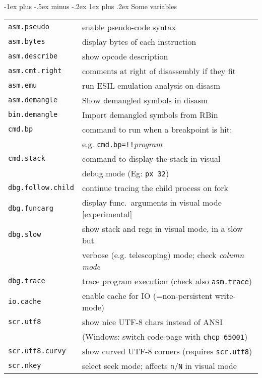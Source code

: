 \documentclass[a4paper,landscape]{article}
\makeatletter
\renewcommand{\subsubsection}{\@startsection{subsubsection}{3}{0mm}%
                                {-1ex plus -.5ex minus -.2ex}%
                                {1ex plus .2ex}%
                                {\normalfont\small\bfseries}}
\makeatother
\begin{document}
\begin{multicols*}{3}
\subsubsection{Some variables}
\begin{tabular}{@{}ll@{}}
\texttt{asm.pseudo} & enable pseudo-code syntax \\
\texttt{asm.bytes} & display bytes of each instruction \\
\texttt{asm.describe} & show opcode description \\
\texttt{asm.cmt.right} & comments at right of disassembly if they fit \\
\texttt{asm.emu} & run ESIL emulation analysis on disasm \\
\texttt{asm.demangle} & Show demangled symbols in disasm \\
\texttt{bin.demangle} & Import demangled symbols from RBin \\
\texttt{cmd.bp} & command to run when a breakpoint is hit; \\ & e.g. \texttt{cmd.bp=!!}\textit{program} \\
\texttt{cmd.stack} & command to display the stack in visual \\ & debug mode (Eg: \texttt{px 32}) \\
\texttt{dbg.follow.child} & continue tracing the child process on fork \\
\texttt{dbg.funcarg} & display func.~arguments in visual mode [experimental]\\
\texttt{dbg.slow} & show stack and regs in visual mode, in a slow but \\ & verbose (e.g. telescoping) mode; check \emph{column mode} \\
\texttt{dbg.trace} & trace program execution (check also \texttt{asm.trace}) \\
\texttt{io.cache} & enable cache for IO (=non-persistent write-mode) \\
\texttt{scr.utf8} & show nice UTF-8 chars instead of ANSI \\ & (Windows: switch code-page with \texttt{chcp 65001})\\
\texttt{scr.utf8.curvy} & show curved UTF-8 corners (requires \texttt{scr.utf8}) \\
\texttt{scr.nkey} & select seek mode; affects \texttt{n}/\texttt{N} in visual mode \\

\end{tabular}
\end{multicols*}
\end{document}
